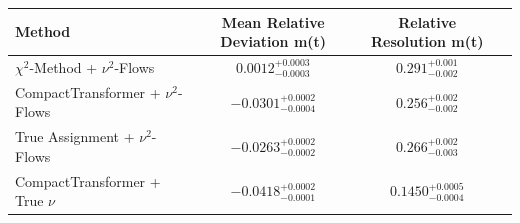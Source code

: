    \begin{tabular}{lccc}
        \toprule
        Method & Mean Relative Deviation m(t) & Relative Resolution m(t) \\
        \midrule
        $\chi^2$-Method + $\nu^2$-Flows & $0.0012_{-0.0003}^{+0.0003}$ & $0.291_{-0.002}^{+0.001}$ \\
        CompactTransformer + $\nu^2$-Flows & $-0.0301_{-0.0004}^{+0.0002}$ & $0.256_{-0.002}^{+0.002}$ \\
        True Assignment + $\nu^2$-Flows & $-0.0263_{-0.0002}^{+0.0002}$ & $0.266_{-0.003}^{+0.002}$ \\
        CompactTransformer + True $\nu$ & $-0.0418_{-0.0001}^{+0.0002}$ & $0.1450_{-0.0004}^{+0.0005}$ \\
        \bottomrule
    \end{tabular}